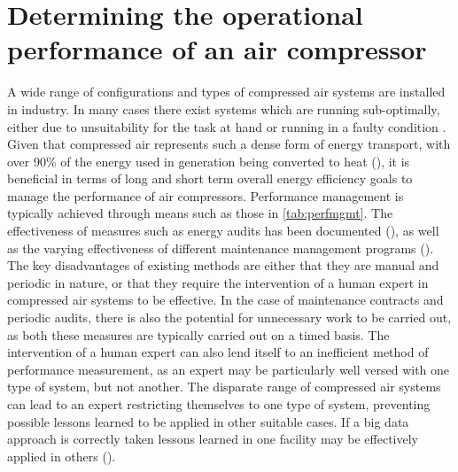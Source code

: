 \section{Determining the operational performance of an air compressor}
\label{sec:probstatement}
A wide range of configurations and types of compressed air systems are installed in industry. In many cases there exist systems which are running sub-optimally, either due to unsuitability for the task at hand or running in a faulty condition \cite{SEAI2007a}. Given that compressed air represents such a dense form of energy transport, with over 90\% of the energy used in generation being converted to heat (\cite{SEAI}), it is beneficial in terms of long and short term overall energy efficiency goals to manage the performance of air compressors. Performance management is typically achieved through means such as those in  \autoref{tab:perfmgmt}. The effectiveness of measures such as energy audits has been documented (\cite{Fleiter2012}), as well as the varying effectiveness of different maintenance management programs (\cite{Duffuaa2015}). The key disadvantages of existing methods are either that they are manual and periodic in nature, or that they require the intervention of a human expert in compressed air systems to be effective. In the case of maintenance contracts and periodic audits, there is also the potential for unnecessary work to be carried out, as both these measures are typically carried out on a timed basis. The intervention of a human expert can also lend itself to an inefficient method of performance measurement, as an expert may be particularly well versed with one type of system, but not another. The disparate range of compressed air systems can lead to an expert restricting themselves to one type of system, preventing possible lessons learned to be applied in other suitable cases. If a big data approach is correctly taken lessons learned in one facility may be effectively applied in others (\cite{ODonovan2015}). 

